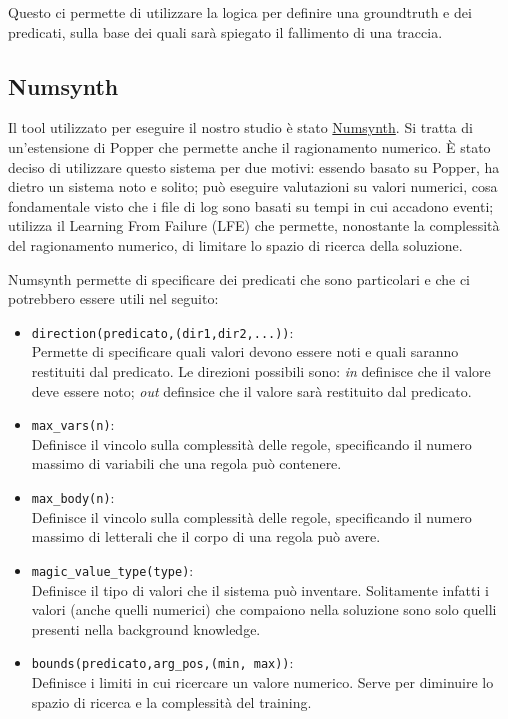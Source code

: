 Questo ci permette di utilizzare la logica per definire una groundtruth e dei predicati, sulla base dei quali sarà spiegato il fallimento di una traccia.

\subsection{Numsynth}
Il tool utilizzato per eseguire il nostro studio è stato \href{https://github.com/celinehocquette/numsynth-aaai23}{Numsynth}. Si tratta di un'estensione di Popper che permette anche il ragionamento numerico. È stato deciso di utilizzare questo sistema per due motivi: essendo basato su Popper, ha dietro un sistema noto e solito; può eseguire valutazioni su valori numerici, cosa fondamentale visto che i file di log sono basati su tempi in cui accadono eventi; utilizza il Learning From Failure (LFE) che permette, nonostante la complessità del ragionamento numerico, di limitare lo spazio di ricerca della soluzione.

\myskip

Numsynth permette di specificare dei predicati che sono particolari e che ci potrebbero essere utili nel seguito:
\begin{itemize}
    \item \texttt{direction(predicato,(dir1,dir2,...))}: \\
        Permette di specificare quali valori devono essere noti e quali saranno restituiti dal predicato. Le direzioni possibili sono: \textit{in} definisce che il valore deve essere noto; \textit{out} definsice che il valore sarà restituito dal predicato.
    \item \texttt{max\_vars(n)}: \\
        Definisce il vincolo sulla complessità delle regole, specificando il numero massimo di variabili che una regola può contenere.
    \item \texttt{max\_body(n)}: \\
        Definisce il vincolo sulla complessità delle regole, specificando il numero massimo di letterali che il corpo di una regola può avere.
    \item \texttt{magic\_value\_type(type)}: \\
        Definisce il tipo di valori che il sistema può inventare. Solitamente infatti i valori (anche quelli numerici) che compaiono nella soluzione sono solo quelli presenti nella background knowledge.
    \item \texttt{bounds(predicato,arg\_pos,(min, max))}: \\
        Definisce i limiti in cui ricercare un valore numerico. Serve per diminuire lo spazio di ricerca e la complessità del training.
\end{itemize}